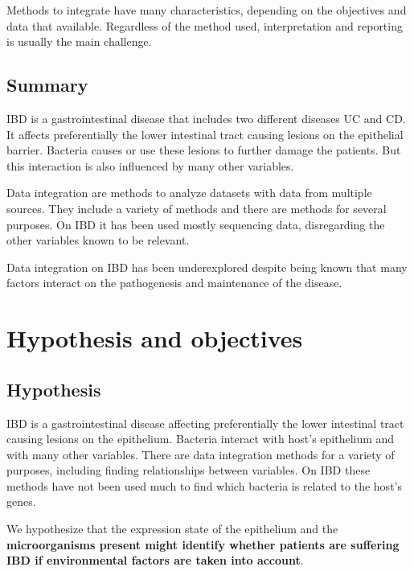 \documentclass[
  12pt,
  a4paper,
  twoside,
  openright]{book}
\begin{document}
Methods to integrate have many characteristics, depending on the objectives and data that available.
Regardless of the method used, interpretation and reporting is usually the main challenge.

\hypertarget{summary}{%
\section{Summary}\label{summary}}

IBD is a gastrointestinal disease that includes two different diseases UC and CD.
It affects preferentially the lower intestinal tract causing lesions on the epithelial barrier.
Bacteria causes or use these lesions to further damage the patients.
But this interaction is also influenced by many other variables.

Data integration are methods to analyze datasets with data from multiple sources.
They include a variety of methods and there are methods for several purposes.
On IBD it has been used mostly sequencing data, disregarding the other variables known to be relevant.

Data integration on IBD has been underexplored despite being known that many factors interact on the pathogenesis and maintenance of the disease.

\hypertarget{hypothesis-and-objectives}{%
\chapter{Hypothesis and objectives}\label{hypothesis-and-objectives}}

\hypertarget{hypothesis}{%
\section{Hypothesis}\label{hypothesis}}

IBD is a gastrointestinal disease affecting preferentially the lower intestinal tract causing lesions on the epithelium.
Bacteria interact with host's epithelium and with many other variables.
There are data integration methods for a variety of purposes, including finding relationships between variables.
On IBD these methods have not been used much to find which bacteria is related to the host's genes.

We hypothesize that the expression state of the epithelium and the \textbf{microorganisms present might identify whether patients are suffering IBD if environmental factors are taken into account}.
\end{document}
